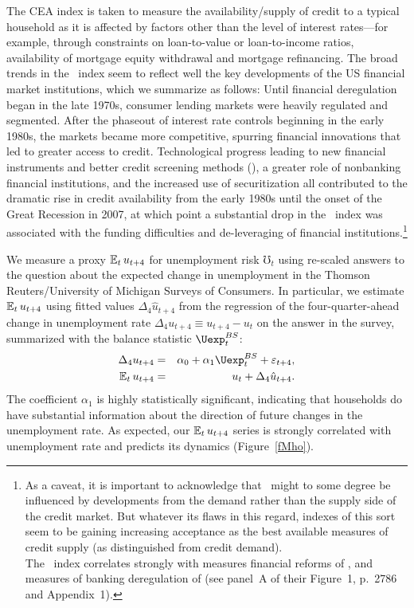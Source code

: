 \documentclass[titlepage]{\econtex}
\begin{document}
The CEA index is taken to measure the availability/supply of credit to a typical household as it is affected by factors other than the level of interest rates---for example, through constraints on loan-to-value or loan-to-income ratios, availability of mortgage equity withdrawal and mortgage refinancing. The broad trends in the \CEA\ index seem to reflect well the key developments of the US financial market institutions, which we summarize as follows: Until financial deregulation began in the late 1970s, consumer lending markets were heavily regulated and segmented. After the phaseout of interest rate controls beginning in the early 1980s, the markets became more competitive, spurring financial innovations that led to greater access to credit. Technological progress leading to new financial instruments and better credit screening methods (\cite{pjInfo}), a greater role of nonbanking financial institutions, and the increased use of securitization all contributed to the dramatic rise in credit availability from the early 1980s until the onset of the Great Recession in 2007, at which point a substantial drop in the \CEA\ index was associated with the funding difficulties and de-leveraging of financial institutions.\footnote{As a caveat, it is important to acknowledge that \CEA\ might to some degree be influenced by developments from the demand rather than the supply side of the credit market.  But whatever its flaws in this regard, indexes of this sort seem to be gaining increasing acceptance as the best available measures of credit supply (as distinguished from credit demand).\\
  The \CEA\ index correlates strongly with measures financial reforms of \cite{abiadEtAl_FinReforms}, and measures of banking deregulation of \cite{demyanykEtAl_JoF07_deregulation} (see panel~A of their Figure~1, p.\ 2786 and Appendix~1).   }

We measure a proxy $\operatorname{\mathbb{E}}_t u_{t+4}$ for unemployment risk $\mho_t$ using re-scaled answers to the question about the expected change in unemployment in the Thomson Reuters/University of Michigan Surveys of Consumers. %
 In particular, we estimate $\operatorname{\mathbb{E}}_t u_{t+4}$ using fitted values $\Delta_4 \hat{u}_{t+4}$ from the regression of the four-quarter-ahead change in unemployment rate $\Delta_4 u_{t+4}\equiv u_{t+4}-u_t$ on the answer in the survey, summarized with the balance statistic $\Uexp^{BS}_t$:
\begin{eqnarray*}
\Delta_4 u_{t+4} &=& \alpha_0+\alpha_1\Uexp^{BS}_t+\varepsilon_{t+4},\\
\Ex_t u_{t+4}&=&u_t+ \Delta_4 \hat{u}_{t+4}.
\end{eqnarray*}
The coefficient $\alpha_{1}$ is highly statistically significant, indicating that households do have substantial information about the direction of future changes in the unemployment rate.  As expected, our $\operatorname{\mathbb{E}}_{t} u_{t+4}$ series is strongly correlated with unemployment rate and predicts its dynamics (Figure~\ref{fMho}).%
\end{document}
